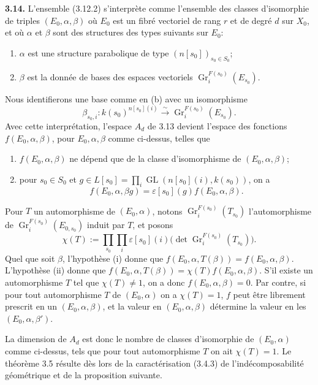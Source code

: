 \documentclass[11pt]{article}
\newcommand{\GL}{\operatorname{GL}}
\newcommand{\Gr}{\operatorname{Gr}}
\newcommand{\para}[1]{\medskip\noindent\textbf{#1}\enspace}
\begin{document}
\para{3.14.} L'ensemble (3.12.2) s'interprète comme l'ensemble des classes d'isomorphie de triples \((E_0,\alpha,\beta)\) où \(E_0\) est un fibré vectoriel de rang \(r\) et de degré \(d\) sur \(X_0\), et où \(\alpha\) et \(\beta\) sont des structures des types suivants sur \(E_0\):
\begin{enumerate}[label=(\alph*),leftmargin=2.5em]
\item \(\alpha\) est une structure parabolique de type \((n[s_0])_{s_0\in S_0}\);
\item \(\beta\) est la donnée de bases des espaces vectoriels \(\Gr_i^{F(s_0)}(E_{s_0})\).
\end{enumerate}
Nous identifierons une base comme en (b) avec un isomorphisme
\[
  \beta_{s_0,i}:k(s_0)^{n[s_0](i)}\xrightarrow{\sim}\Gr_i^{F(s_0)}(E_{s_0}).
\]
Avec cette interprétation, l'espace \(A_d\) de 3.13 devient l'espace des fonctions \(f(E_0,\alpha,\beta)\), pour \(E_0,\alpha,\beta\) comme ci-dessus, telles que
\begin{enumerate}[label=(\roman*),leftmargin=2.5em]
\item \(f(E_0,\alpha,\beta)\) ne dépend que de la classe d'isomorphisme de \((E_0,\alpha,\beta)\);
\item pour \(s_0\in S_0\) et \(g\in L[s_0]=\prod_i\GL(n[s_0](i),k(s_0))\), on a
\[
  f(E_0,\alpha,\beta g)=\varepsilon[s_0](g)f(E_0,\alpha,\beta).
\]
\end{enumerate}
Pour \(T\) un automorphisme de \((E_0,\alpha)\), notons \(\Gr_i^{F(s_0)}(T_{s_0})\) l'automorphisme de \(\Gr_i^{F(s_0)}(E_{0,s_0})\) induit par \(T\), et posons
\begin{equation}
  \chi(T):=\prod_{s_0}\prod_i \varepsilon[s_0](i)\bigl(\det \Gr_i^{F(s_0)}(T_{s_0})\bigr).
\tag{3.14.1}
\end{equation}
Quel que soit \(\beta\), l'hypothèse (i) donne que \(f(E_0,\alpha,T(\beta))=f(E_0,\alpha,\beta)\). L'hypothèse (ii) donne que \(f(E_0,\alpha,T(\beta))=\chi(T)f(E_0,\alpha,\beta)\). S'il existe un automorphisme \(T\) tel que \(\chi(T)\neq1\), on a donc \(f(E_0,\alpha,\beta)=0\). Par contre, si pour tout automorphisme \(T\) de \((E_0,\alpha)\) on a \(\chi(T)=1\), \(f\) peut être librement prescrit en un \((E_0,\alpha,\beta)\), et la valeur en \((E_0,\alpha,\beta)\) détermine la valeur en les \((E_0,\alpha,\beta')\).

La dimension de \(A_d\) est donc le nombre de classes d'isomorphie de \((E_0,\alpha)\) comme ci-dessus, tels que pour tout automorphisme \(T\) on ait \(\chi(T)=1\). Le théorème 3.5 résulte dès lors de la caractérisation (3.4.3) de l'indécomposabilité géométrique et de la proposition suivante.
\end{document}
